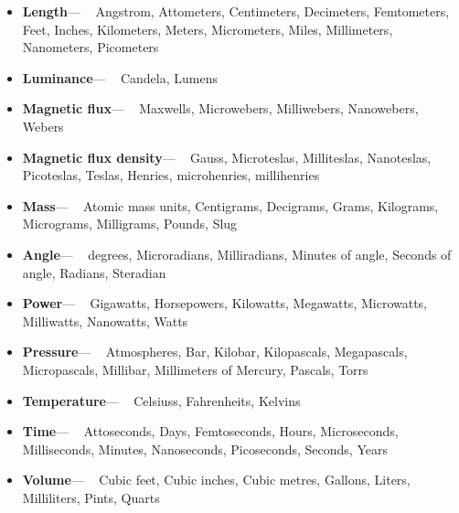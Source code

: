 \documentclass[12pt]{article}
\begin{document}
\begin{itemize}
\item \textbf{Length}--- ~
Angstrom,
Attometers,
Centimeters,
Decimeters,
Femtometers,
Feet,
Inches,
Kilometers,
Meters,
Micrometers,
Miles,
Millimeters,
Nanometers,
Picometers

\item \textbf{Luminance}--- ~
Candela,
Lumens

\item \textbf{Magnetic flux}--- ~
Maxwells,
Microwebers,
Milliwebers,
Nanowebers,
Webers

\item \textbf{Magnetic flux density}--- ~
Gauss,
Microteslas,
Milliteslas,
Nanoteslas,
Picoteslas,
Teslas,
Henries,
microhenries,
millihenries

\item \textbf{Mass}--- ~
Atomic mass units,
Centigrams,
Decigrams,
Grams,
Kilograms,
Micrograms,
Milligrams,
Pounds,
Slug

\item \textbf{Angle}--- ~
degrees,
Microradians,
Milliradians,
Minutes of angle,
Seconds of angle,
Radians,
Steradian

\item \textbf{Power}--- ~
Gigawatts,
Horsepowers,
Kilowatts,
Megawatts,
Microwatts,
Milliwatts,
Nanowatts,
Watts

\item \textbf{Pressure}--- ~
Atmospheres,
Bar,
Kilobar,
Kilopascals,
Megapascals,
Micropascals,
Millibar,
Millimeters of Mercury,
Pascals,
Torrs

\item \textbf{Temperature}--- ~
Celsiuss,
Fahrenheits,
Kelvins

\item \textbf{Time}--- ~
Attoseconds,
Days,
Femtoseconds,
Hours,
Microseconds,
Milliseconds,
Minutes,
Nanoseconds,
Picoseconds,
Seconds,
Years

\item \textbf{Volume}--- ~
Cubic feet,
Cubic inches,
Cubic metres,
Gallons,
Liters,
Milliliters,
Pints,
Quarts
\end{itemize}
\end{document}
